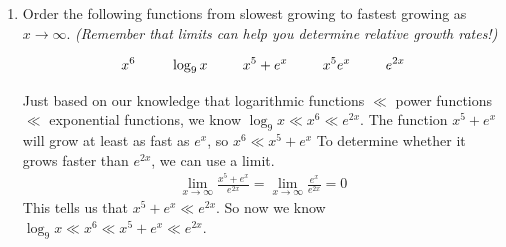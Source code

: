 \documentclass{article}
\begin{document}
\begin{enumerate}
\begin{enumerate}
\begin{enumerate}
        \begin{solution}
        First, observe that we can use logarithm rules to simplify.
        \begin{align*}
            \lim_{x\to 0^+} x
        \ln\Big(\dfrac{3}{x}\Big) &= \lim_{x\to 0^+} (
        x\ln 3 - x\ln x) \\
        &= \lim_{x\to 0^+} (-x\ln x) \\
        \intertext{
            As $x\to 0^+$, $\ln(x) \to -\infty$, so this limit currently has the form ``$0 \cdot \infty$.'' We will rewrite algebraically then use L'Hopital's Rule.
        }
        &= \lim_{x \to 0^+} \frac{\ln x}{-x^{-1}}\\
        &\stackrel{\text{L'H}}{=} \lim_{x\to 0^+} \frac{x^{-1}}{x^{-2}}\\
        &= \lim_{x\to 0^+} x \\
        &= \boxed{0}
        \end{align*}
        \end{solution}
 \end{enumerate}
         


   
    \item Order the following functions from slowest growing to fastest growing as $x\to \infty$. \textit{(Remember that  limits can help you determine relative growth rates!)}

    \[x^6 \hspace{.35 in} \log_9 x \hspace{.35 in} x^5 + e^x \hspace{.35 in} x^5e^x
    \hspace{.35 in} e^{2x}\]


\probonly{
    \[\underline{\hspace{1 in}} << \underline{\hspace{1 in}} << \underline{\hspace{1 in}} << \underline{\hspace{1 in}} << \underline{\hspace{1 in}} \]
}

\pspace{\vfill}

\begin{solution}
    Just based on our knowledge that logarithmic functions $\ll$ power functions $\ll$ exponential functions, we know $\log_9 x \ll x^6 \ll e^{2x}$. The function $x^5+e^x$ will grow at least as fast as $e^x$, so $x^6 \ll x^5+e^x$ To determine whether it grows faster than $e^{2x}$, we can use a limit.
    \begin{align*}
        \lim_{x\to \infty} \frac{x^5+e^x}{e^{2x}} = \lim_{x\to\infty} \frac{e^x} {e^{2x}}= 0
    \end{align*}
    This tells us that $x^5+e^x \ll e^{2x}$. So now we know $\log_9 x \ll x^6 \ll x^5+e^x \ll e^{2x}$.


\end{solution}
\end{enumerate}
\end{enumerate}
\end{document}

